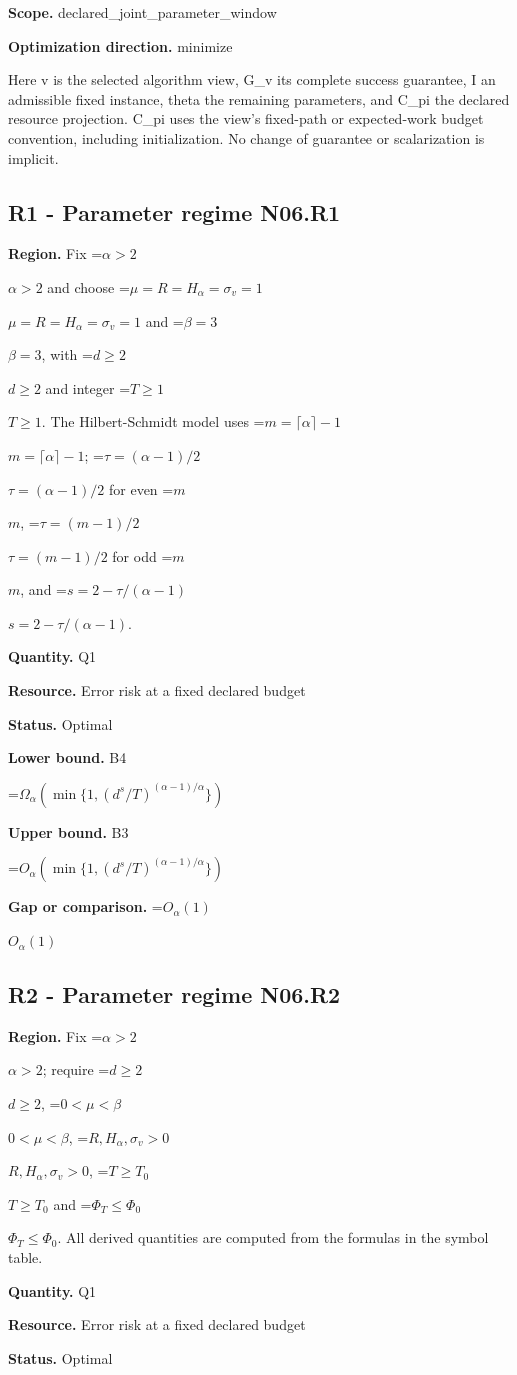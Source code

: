 \documentclass[10pt,a4paper]{article}
\newcommand{\AtlasMath}[1]{\par\begingroup\centering\setbox0=\hbox{$\displaystyle #1$}\ifdim\wd0>1.4\linewidth\typeout{ATLAS WIDE FORMULA: \the\wd0}\fi\ifdim\wd0>\linewidth\resizebox{\linewidth}{!}{\box0}\else\box0\fi\par\endgroup}
\newcommand{\AtlasInlineMath}[1]{\begingroup\setbox0=\hbox{$#1$}\ifdim\wd0>.4\linewidth\endgroup\AtlasMath{#1}\else\endgroup$#1$\fi}
\begin{document}
\textbf{Scope.} declared\_joint\_parameter\_window

\textbf{Optimization direction.} minimize

Here v is the selected algorithm view, G\_v its complete success guarantee, I an admissible fixed instance, theta the remaining parameters, and C\_pi the declared resource projection. C\_pi uses the view's fixed-path or expected-work budget convention, including initialization. No change of guarantee or scalarization is implicit.

\subsection{R1 - Parameter regime N06.R1}
\textbf{Region.} Fix \AtlasInlineMath{\alpha>2} and choose \AtlasInlineMath{\mu=R=H_\alpha=\sigma_v=1} and \AtlasInlineMath{\beta=3}, with \AtlasInlineMath{d\ge2} and integer \AtlasInlineMath{T\ge1}. The Hilbert-Schmidt model uses \AtlasInlineMath{m=\lceil\alpha\rceil-1}; \AtlasInlineMath{\tau=(\alpha-1)/2} for even \AtlasInlineMath{m}, \AtlasInlineMath{\tau=(m-1)/2} for odd \AtlasInlineMath{m}, and \AtlasInlineMath{s=2-\tau/(\alpha-1)}.

\textbf{Quantity.} Q1

\textbf{Resource.} Error risk at a fixed declared budget

\textbf{Status.} Optimal

\textbf{Lower bound.} B4

\AtlasMath{\Omega_\alpha(\min\{1,(d^s/T)^{(\alpha-1)/\alpha}\})}
\textbf{Upper bound.} B3

\AtlasMath{O_\alpha(\min\{1,(d^s/T)^{(\alpha-1)/\alpha}\})}
\textbf{Gap or comparison.} \AtlasInlineMath{O_\alpha(1)}

\subsection{R2 - Parameter regime N06.R2}
\textbf{Region.} Fix \AtlasInlineMath{\alpha>2}; require \AtlasInlineMath{d\ge2}, \AtlasInlineMath{0<\mu<\beta}, \AtlasInlineMath{R,H_\alpha,\sigma_v>0}, \AtlasInlineMath{T\ge T_0} and \AtlasInlineMath{\Phi_T\le\Phi_0}. All derived quantities are computed from the formulas in the symbol table.

\textbf{Quantity.} Q1

\textbf{Resource.} Error risk at a fixed declared budget

\textbf{Status.} Optimal
\end{document}

